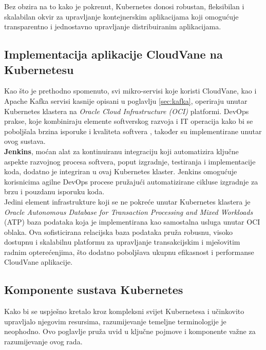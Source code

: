 \documentclass[times, utf8, diplomski]{fer}
\begin{document}
Bez obzira na to kako je pokrenut, Kubernetes donosi robustan, fleksibilan i skalabilan okvir za upravljanje kontejnerskim aplikacijama koji omogućuje transparentno i jednostavno upravljanje distribuiranim aplikacijama.

\subsection{Implementacija aplikacije CloudVane na Kubernetesu}

Kao što je prethodno spomenuto, svi mikro-servisi koje koristi CloudVane, kao i Apache Kafka servisi kasnije opisani u poglavlju \ref{sec:kafka}, operiraju unutar Kubernetes klastera na \emph{Oracle Cloud Infrastructure (OCI)} platformi. DevOps prakse, koje kombiniraju elemente softverskog razvoja  i IT operacija  kako bi se poboljšala brzina isporuke i kvaliteta softvera \citep{courtemanche_what_2021}, također su implementirane unutar ovog sustava.\\

\textbf{Jenkins}, moćan alat za kontinuiranu integraciju koji automatizira ključne aspekte razvojnog procesa softvera, poput izgradnje, testiranja i implementacije koda, dodatno je integriran u ovaj Kubernetes klaster. Jenkins omogućuje korisnicima agilne DevOps procese pružajući automatizirane cikluse izgradnje za brzu i pouzdanu isporuku koda.\\

Jedini element infrastrukture koji se ne pokreće unutar Kubernetes klastera je \emph{Oracle Autonomous Database for Transaction Processing and Mixed Workloads} (ATP) baza podataka koja je implementirana kao samostalna usluga unutar OCI oblaka. Ova sofisticirana relacijska baza podataka pruža robusnu, visoko dostupnu i skalabilnu platformu za upravljanje transakcijskim i mješovitim radnim opterećenjima, što dodatno poboljšava ukupnu efikasnost i performanse CloudVane aplikacije.\\

\subsection{Komponente sustava Kubernetes}
\label{sec:k8sComponents}

Kako bi se uspješno kretalo kroz kompleksni svijet Kubernetesa i učinkovito upravljalo njegovim resursima, razumijevanje temeljne terminologije je neophodno. Ovo poglavlje pruža uvid u ključne pojmove i komponente važne za razumijevanje ovog rada.
\end{document}
